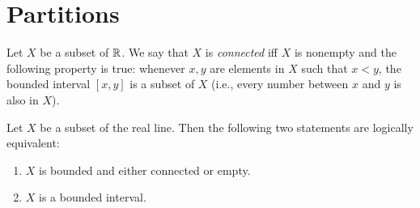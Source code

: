 \section{Partitions}\label{i:sec:11.1}

\begin{defn}\label{i:11.1.1}
  Let \(X\) be a subset of \(\mathbb{R}\).
  We say that \(X\) is \emph{connected} iff \(X\) is nonempty and the following property is true:
  whenever \(x, y\) are elements in \(X\) such that \(x < y\), the bounded interval \([x, y]\) is a subset of \(X\)
  (i.e., every number between \(x\) and \(y\) is also in \(X\)).
\end{defn}

\setcounter{thm}{3}
\begin{lem}\label{i:11.1.4}
  Let \(X\) be a subset of the real line.
  Then the following two statements are logically equivalent:
  \begin{enumerate}
    \item \(X\) is bounded and either connected or empty.
    \item \(X\) is a bounded interval.
  \end{enumerate}
\end{lem}

